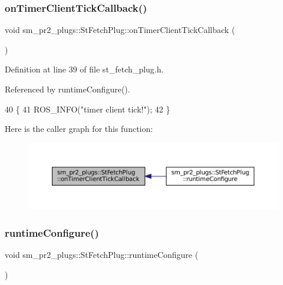\subsubsection{\texorpdfstring{on\+Timer\+Client\+Tick\+Callback()}{onTimerClientTickCallback()}}
{\footnotesize\ttfamily void sm\+\_\+pr2\+\_\+plugs\+::\+St\+Fetch\+Plug\+::on\+Timer\+Client\+Tick\+Callback (\begin{DoxyParamCaption}{ }\end{DoxyParamCaption})\hspace{0.3cm}{\ttfamily [inline]}}



Definition at line 39 of file st\+\_\+fetch\+\_\+plug.\+h.



Referenced by runtime\+Configure().


\begin{DoxyCode}
40     \{
41         ROS\_INFO(\textcolor{stringliteral}{"timer client tick!"});
42     \}
\end{DoxyCode}
Here is the caller graph for this function\+:
\nopagebreak
\begin{figure}[H]
\begin{center}
\leavevmode
\includegraphics[width=350pt]{structsm__pr2__plugs_1_1StFetchPlug_aaf8460a7e96dfbfe7eefbd3f2fd41b41_icgraph}
\end{center}
\end{figure}
\mbox{\label{structsm__pr2__plugs_1_1StFetchPlug_ab366cd931391170e7c7fa3e591c66d73}} 
\subsubsection{\texorpdfstring{runtime\+Configure()}{runtimeConfigure()}}
{\footnotesize\ttfamily void sm\+\_\+pr2\+\_\+plugs\+::\+St\+Fetch\+Plug\+::runtime\+Configure (\begin{DoxyParamCaption}{ }\end{DoxyParamCaption})\hspace{0.3cm}{\ttfamily [inline]}}



